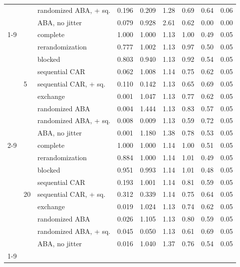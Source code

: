 \begin{table}[t]
\begin{tabular}{lllrrrrrr}
 &  & randomized ABA, + sq. & 0.196 & 0.209 & 1.28 & 0.69 & 0.64 & 0.06 \\
 &  & ABA, no jitter & 0.079 & 0.928 & 2.61 & 0.62 & 0.00 & 0.00 \\
\cline{1-9} \cline{2-9}
\multirow[t]{18}{*}{50} & \multirow[t]{9}{*}{5} & complete & 1.000 & 1.000 & 1.13 & 1.00 & 0.49 & 0.05 \\
 &  & rerandomization & 0.777 & 1.002 & 1.13 & 0.97 & 0.50 & 0.05 \\
 &  & blocked & 0.803 & 0.940 & 1.13 & 0.92 & 0.54 & 0.05 \\
 &  & sequential CAR & 0.062 & 1.008 & 1.14 & 0.75 & 0.62 & 0.05 \\
 &  & sequential CAR, + sq. & 0.110 & 0.142 & 1.13 & 0.65 & 0.69 & 0.05 \\
 &  & exchange & 0.001 & 1.047 & 1.13 & 0.77 & 0.62 & 0.05 \\
 &  & randomized ABA & 0.004 & 1.444 & 1.13 & 0.83 & 0.57 & 0.05 \\
 &  & randomized ABA, + sq. & 0.008 & 0.009 & 1.13 & 0.59 & 0.72 & 0.05 \\
 &  & ABA, no jitter & 0.001 & 1.180 & 1.38 & 0.78 & 0.53 & 0.05 \\
\cline{2-9}
 & \multirow[t]{9}{*}{20} & complete & 1.000 & 1.000 & 1.14 & 1.00 & 0.51 & 0.05 \\
 &  & rerandomization & 0.884 & 1.000 & 1.14 & 1.01 & 0.49 & 0.05 \\
 &  & blocked & 0.951 & 0.993 & 1.14 & 1.01 & 0.48 & 0.05 \\
 &  & sequential CAR & 0.193 & 1.001 & 1.14 & 0.81 & 0.59 & 0.05 \\
 &  & sequential CAR, + sq. & 0.312 & 0.339 & 1.14 & 0.75 & 0.64 & 0.05 \\
 &  & exchange & 0.019 & 1.024 & 1.13 & 0.74 & 0.62 & 0.05 \\
 &  & randomized ABA & 0.026 & 1.105 & 1.13 & 0.80 & 0.59 & 0.05 \\
 &  & randomized ABA, + sq. & 0.045 & 0.050 & 1.13 & 0.61 & 0.69 & 0.05 \\
 &  & ABA, no jitter & 0.016 & 1.040 & 1.37 & 0.76 & 0.54 & 0.05 \\
\cline{1-9} \cline{2-9}
\bottomrule
\end{tabular}
\end{table}
